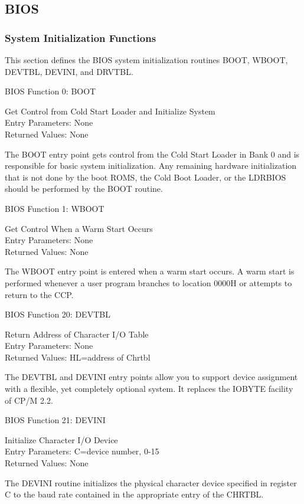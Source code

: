 \subsection{BIOS}
\subsubsection{System Initialization Functions}
This section defines the BIOS system initialization routines BOOT,
WBOOT, DEVTBL, DEVINI, and DRVTBL.

BIOS Function 0: BOOT

Get Control from Cold Start Loader and Initialize System\\
Entry Parameters: None\\
Returned Values: None

The BOOT entry point gets control from the Cold Start Loader in Bank 0
and is responsible for basic system initialization. Any remaining
hardware initialization that is not done by the boot ROMS, the Cold
Boot Loader, or the LDRBIOS should be performed by the BOOT routine.

BIOS Function 1: WBOOT

Get Control When a Warm Start Occurs\\
Entry Parameters: None\\
Returned Values: None

The WBOOT entry point is entered when a warm start occurs. A warm
start is performed whenever a user program branches to location 0000H
or attempts to return to the CCP.

BIOS Function 20: DEVTBL

Return Address of Character I/O Table\\
Entry Parameters: None\\
Returned Values: HL=address of Chrtbl

The DEVTBL and DEVINI entry points allow you to support device
assignment with a flexible, yet completely optional system. It
replaces the IOBYTE facility of CP/M 2.2.

BIOS Function 21: DEVINI

Initialize Character I/O Device\\
Entry Parameters: C=device number, 0-15\\
Returned Values: None

The DEVINI routine initializes the physical character device specified
in register C to the baud rate contained in the appropriate entry of
the CHRTBL.


